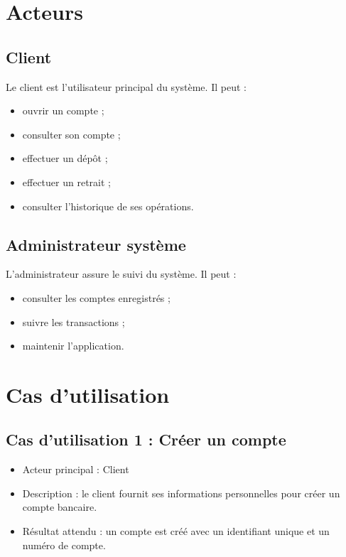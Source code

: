 \documentclass[12pt,a4paper]{article}
\begin{document}
\section{Acteurs}

\subsection{Client}

Le client est l'utilisateur principal du système. Il peut :

\begin{itemize}
    \item ouvrir un compte ;
    \item consulter son compte ;
    \item effectuer un dépôt ;
    \item effectuer un retrait ;
    \item consulter l'historique de ses opérations.
\end{itemize}

\subsection{Administrateur système}

L'administrateur assure le suivi du système. Il peut :

\begin{itemize}
    \item consulter les comptes enregistrés ;
    \item suivre les transactions ;
    \item maintenir l'application.
\end{itemize}

\section{Cas d'utilisation}

\subsection{Cas d'utilisation 1 : Créer un compte}

\begin{itemize}
    \item Acteur principal : Client
    \item Description : le client fournit ses informations personnelles pour créer un compte bancaire.
    \item Résultat attendu : un compte est créé avec un identifiant unique et un numéro de compte.
\end{itemize}
\end{document}
